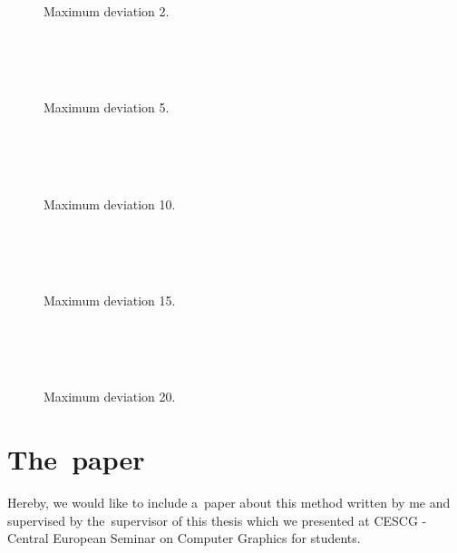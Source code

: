 \begin{figure}
	\begin{center}
		 \\ 
		 \\ 
		 \\ 
	\end{center}
	\caption{Maximum deviation 2.}
\end{figure}

\begin{figure}
	\begin{center}
		 \\ 
		 \\ 
		 \\ 
	\end{center}
	\caption{Maximum deviation 5.}
\end{figure}

\begin{figure}
	\begin{center}
		 \\ 
		 \\ 
		 \\ 
	\end{center}
	\caption{Maximum deviation 10.}
\end{figure}

\begin{figure}
	\begin{center}
		 \\ 
		 \\ 
		 \\ 
	\end{center}
	\caption{Maximum deviation 15.}
\end{figure}

\begin{figure}
	\begin{center}
		 \\ 
		 \\ 
		 \\ 
	\end{center}
	\caption{Maximum deviation 20.}
\end{figure}

\chapter{The~paper}
\label{att:paper}

Hereby, we would like to include a~paper about this method written by me and supervised by the~supervisor of this thesis which we presented at CESCG - Central European Seminar on Computer Graphics for students.
%
